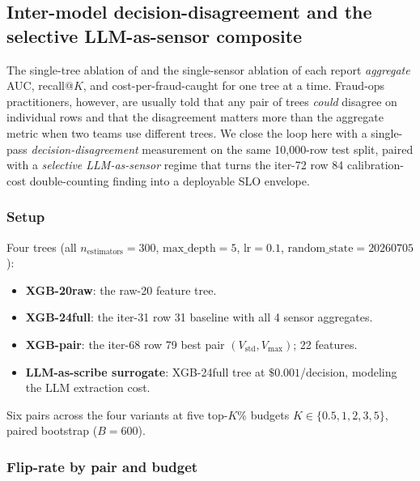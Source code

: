 \subsection{Inter-model decision-disagreement and the selective LLM-as-sensor
composite}\label{sec:p8-decision-disagreement}

The single-tree ablation of  and the
single-sensor ablation of  each report
\emph{aggregate} AUC, recall@$K$, and cost-per-fraud-caught for one
tree at a time. Fraud-ops practitioners, however, are usually told
that any pair of trees \emph{could} disagree on individual rows and
that the disagreement matters more than the aggregate metric when
two teams use different trees. We close the loop here with a
single-pass \emph{decision-disagreement} measurement on the same
10,000-row test split, paired with a \emph{selective LLM-as-sensor}
regime that turns the iter-72 row 84 calibration-cost
double-counting finding into a deployable SLO envelope.

\subsubsection{Setup}

Four trees (all $n_\text{estimators}{=}300$, $\text{max\_depth}{=}5$,
$\text{lr}{=}0.1$, $\text{random\_state}{=}20260705$):
\begin{itemize}
    \item \textbf{XGB-20raw}: the raw-20 feature tree.
    \item \textbf{XGB-24full}: the iter-31 row 31 baseline with all 4
          sensor aggregates.
    \item \textbf{XGB-pair}: the iter-68 row 79 best pair
          $(V_\text{std}, V_\text{max})$; 22 features.
    \item \textbf{LLM-as-scribe surrogate}: XGB-24full tree at
          $\$0.001$/decision, modeling the LLM extraction cost.
\end{itemize}
Six pairs across the four variants at five top-$K$\% budgets
$K \in \{0.5, 1, 2, 3, 5\}$, paired bootstrap ($B{=}600$).

\subsubsection{Flip-rate by pair and budget}\label{sec:p8-decision-disagreement-flip}

